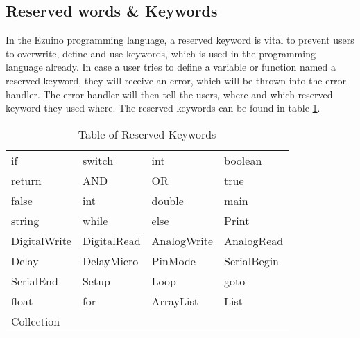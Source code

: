 \subsection{Reserved words \& Keywords}
In the Ezuino programming language, a reserved keyword is vital to prevent users to overwrite, define and use keywords, which is used in the programming language already. In case a user tries to define a variable or function named a reserved keyword, they will receive an error, which will be thrown into the error handler. The error handler will then tell the users, where and which reserved keyword they used where. The reserved keywords can be found in table \ref{reservedKeywordsList}.

\begin{table}[H]
\centering
\caption{Table of Reserved Keywords}
\begin{tabular}{llll}
if           & switch      & int         & boolean     \\
return       & AND         & OR          & true        \\
false        & int         & double      & main        \\
string       & while       & else        & Print       \\
DigitalWrite & DigitalRead & AnalogWrite & AnalogRead  \\
Delay        & DelayMicro  & PinMode     & SerialBegin \\
SerialEnd    & Setup       & Loop        & goto        \\
float        & for         & ArrayList   & List        \\
Collection   &             &             &            
\end{tabular}
\label{reservedKeywordsList}
\end{table}